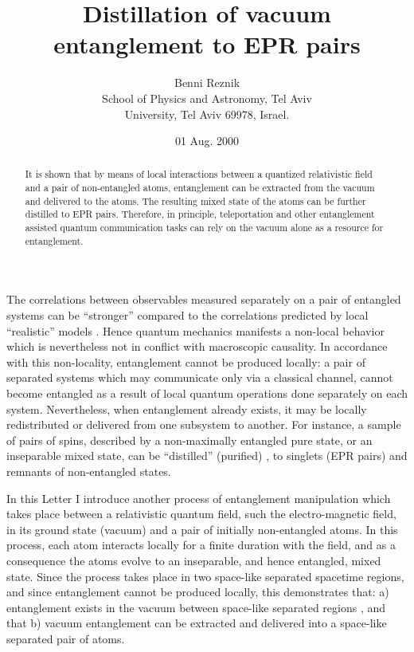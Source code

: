 \documentclass[12pt]{article}
\begin{document}
\title{  Distillation of vacuum entanglement to EPR pairs    }
\author{ Benni Reznik \\
School of Physics and Astronomy, Tel Aviv \\
University, Tel Aviv 69978, Israel.}
\date{01 Aug. 2000}

\maketitle

\begin{abstract}
It is  shown that by means of local interactions between a
quantized relativistic field and a pair of non-entangled atoms,
entanglement can be extracted from the vacuum
and delivered to the atoms.
The resulting mixed state of the atoms can be further
distilled to EPR pairs.
Therefore, in principle, teleportation and other entanglement
assisted quantum communication tasks can rely on the vacuum
alone as a resource for entanglement.

\end{abstract}






The correlations between observables measured separately on a pair
of entangled systems can be ``stronger''  compared to the
correlations predicted by  local ``realistic'' models \cite{bell}.
Hence quantum mechanics manifests a non-local behavior which is
nevertheless not in conflict with macroscopic causality. In
accordance with this non-locality, entanglement cannot be produced
locally: a pair of separated systems which may communicate only via
a classical channel, cannot become entangled
as a result of local quantum operations done separately on each system.
Nevertheless, when  entanglement already exists, it may be locally
redistributed or delivered from one subsystem to another. For
instance, a sample of pairs of spins, described by a
non-maximally entangled pure state, or an
inseparable\cite{ins} mixed state, can be
``distilled'' (purified) \cite{concentration,purification}, to singlets (EPR pairs)
and remnants of non-entangled states.


In this Letter I introduce another process of entanglement
manipulation which takes place between a relativistic quantum field,
 such the electro-magnetic field,
in its ground state (vacuum) and a pair of initially non-entangled atoms.
In this process, each atom interacts locally for a finite duration with
the field,  and as a consequence the atoms evolve to an
inseparable, and hence entangled, mixed state.
Since the process takes place in two space-like separated spacetime
regions,
and since entanglement cannot be produced locally, this demonstrates that:
a) entanglement exists in the vacuum between space-like
separated regions  \cite{unruh,werner},
and that
b) vacuum entanglement can be extracted and delivered into a space-like
separated pair of atoms.
\end{document}
